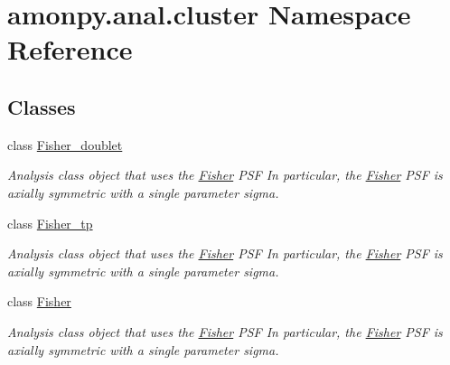 \hypertarget{namespaceamonpy_1_1anal_1_1cluster}{\section{amonpy.\-anal.\-cluster Namespace Reference}
\label{namespaceamonpy_1_1anal_1_1cluster}
}
\subsection*{Classes}
\begin{DoxyCompactItemize}
\item 
class \hyperlink{classamonpy_1_1anal_1_1cluster_1_1_fisher__doublet}{Fisher\-\_\-doublet}
\begin{DoxyCompactList}\small\item\em Analysis class object that uses the \hyperlink{classamonpy_1_1anal_1_1cluster_1_1_fisher}{Fisher} P\-S\-F In particular, the \hyperlink{classamonpy_1_1anal_1_1cluster_1_1_fisher}{Fisher} P\-S\-F is axially symmetric with a single parameter sigma. \end{DoxyCompactList}\item 
class \hyperlink{classamonpy_1_1anal_1_1cluster_1_1_fisher__tp}{Fisher\-\_\-tp}
\begin{DoxyCompactList}\small\item\em Analysis class object that uses the \hyperlink{classamonpy_1_1anal_1_1cluster_1_1_fisher}{Fisher} P\-S\-F In particular, the \hyperlink{classamonpy_1_1anal_1_1cluster_1_1_fisher}{Fisher} P\-S\-F is axially symmetric with a single parameter sigma. \end{DoxyCompactList}\item 
class \hyperlink{classamonpy_1_1anal_1_1cluster_1_1_fisher}{Fisher}
\begin{DoxyCompactList}\small\item\em Analysis class object that uses the \hyperlink{classamonpy_1_1anal_1_1cluster_1_1_fisher}{Fisher} P\-S\-F In particular, the \hyperlink{classamonpy_1_1anal_1_1cluster_1_1_fisher}{Fisher} P\-S\-F is axially symmetric with a single parameter sigma. \end{DoxyCompactList}\end{DoxyCompactItemize}
